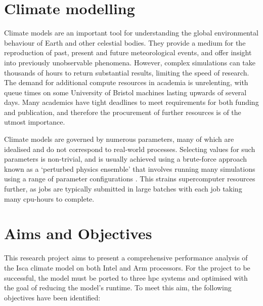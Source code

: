 \documentclass[a4paper,11pt]{report}
\begin{document}
\section{Climate modelling}
Climate models are an important tool for understanding the global environmental behaviour of Earth and other celestial bodies. They provide a medium for the reproduction of past, present and future meteorological events, and offer insight into previously unobservable phenomena. However, complex simulations can take thousands of hours to return substantial results, limiting the speed of research. The demand for additional compute resources in academia is unrelenting, with queue times on some University of Bristol machines lasting upwards of several days. Many academics have tight deadlines to meet requirements for both funding and publication, and therefore the procurement of further resources is of the utmost importance.%
\par
Climate models are governed by numerous parameters, many of which are idealised and do not correspond to real-world processes. Selecting values for such parameters is non-trivial, and is usually achieved using a brute-force approach known as a ‘perturbed physics ensemble’ that involves running many simulations using a range of parameter configurations \cite{evans2012evaluating}. This strains supercomputer resources further, as jobs are typically submitted in large batches with each job taking many cpu-hours to complete.


\section{Aims and Objectives}
This research project aims to present a comprehensive performance analysis of the Isca climate model on both Intel and Arm processors. For the project to be successful, the model must be ported to three \gls{hpc} systems and optimised with the goal of reducing the model's runtime. To meet this aim, the following objectives have been identified:
\end{document}
